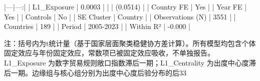 |---|---:|
| L1_Exposure | 0.0003 |
|  | (0.0514) |
| Country FE | Yes |
| Year FE | Yes |
| Controls | No |
| SE Cluster | Country |
| Observations (N) | 3551 |
| Countries | 189 |
| Period | 2005-2023 |
| Within R² | -0.000 |

注：括号内为t统计量（基于国家层面聚类稳健协方差计算）。所有模型均包含个体固定效应与年份固定效应，常数项已被固定效应吸收，不单独报告。
L1_Exposure 为数字贸易规则敞口指数滞后一期；L1_Centrality 为出度中心度滞后一期。边缘组与核心组分别为出度中心度后验分布的后33%